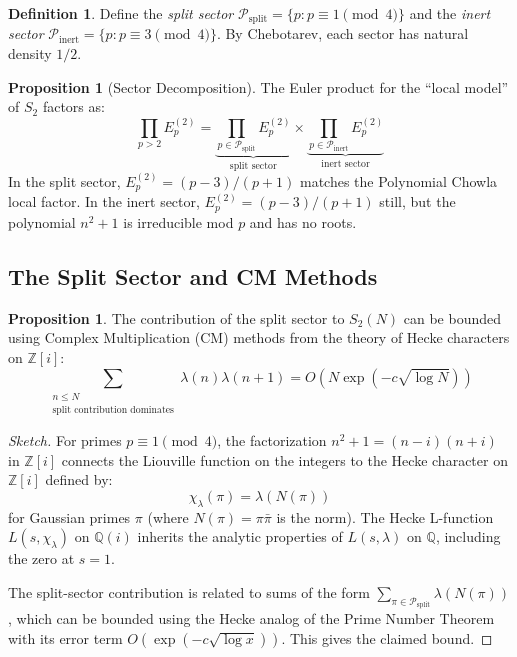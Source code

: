 \documentclass[11pt,a4paper]{article}
\theoremstyle{definition}
\newtheorem{definition}{Definition}[section]
\newtheorem{proposition}[theorem]{Proposition}
\begin{document}
\begin{definition}
\label{def:sectors}
Define the \emph{split sector} $\mathcal{P}_{\mathrm{split}} = \{p : p \equiv 1 \pmod{4}\}$ and the \emph{inert sector} $\mathcal{P}_{\mathrm{inert}} = \{p : p \equiv 3 \pmod{4}\}$. By Chebotarev, each sector has natural density $1/2$.
\end{definition}

\begin{proposition}[Sector Decomposition]
\label{prop:sector-decomp}
The Euler product for the ``local model'' of $S_2$ factors as:
\begin{equation}
\prod_{p > 2} E_p^{(2)} = \underbrace{\prod_{p \in \mathcal{P}_{\mathrm{split}}} E_p^{(2)}}_{\text{split sector}} \times \underbrace{\prod_{p \in \mathcal{P}_{\mathrm{inert}}} E_p^{(2)}}_{\text{inert sector}}
\end{equation}
In the split sector, $E_p^{(2)} = (p-3)/(p+1)$ matches the Polynomial Chowla local factor. In the inert sector, $E_p^{(2)} = (p-3)/(p+1)$ still, but the polynomial $n^2+1$ is irreducible mod $p$ and has no roots.
\end{proposition}

\subsection{The Split Sector and CM Methods}

\begin{proposition}
\label{prop:split-bound}
The contribution of the split sector to $S_2(N)$ can be bounded using Complex Multiplication (CM) methods from the theory of Hecke characters on $\mathbb{Z}[i]$:
\begin{equation}
\sum_{\substack{n \le N \\ \text{split contribution dominates}}} \lambda(n)\lambda(n+1) = O\!\left(N \exp\!\left(-c\sqrt{\log N}\right)\right)
\end{equation}
\end{proposition}

\begin{proof}[Sketch]
For primes $p \equiv 1 \pmod{4}$, the factorization $n^2+1 = (n-i)(n+i)$ in $\mathbb{Z}[i]$ connects the Liouville function on the integers to the Hecke character on $\mathbb{Z}[i]$ defined by:
\begin{equation}
\chi_{\lambda}(\pi) = \lambda(N(\pi))
\end{equation}
for Gaussian primes $\pi$ (where $N(\pi) = \pi\bar{\pi}$ is the norm). The Hecke L-function $L(s, \chi_{\lambda})$ on $\mathbb{Q}(i)$ inherits the analytic properties of $L(s, \lambda)$ on $\mathbb{Q}$, including the zero at $s = 1$.

The split-sector contribution is related to sums of the form
$\sum_{\pi \in \mathcal{P}_{\mathrm{split}}} \lambda(N(\pi))$,
which can be bounded using the Hecke analog of the Prime Number Theorem
with its error term $O(\exp(-c\sqrt{\log x}))$. This gives the claimed bound.
\end{proof}
\end{document}
